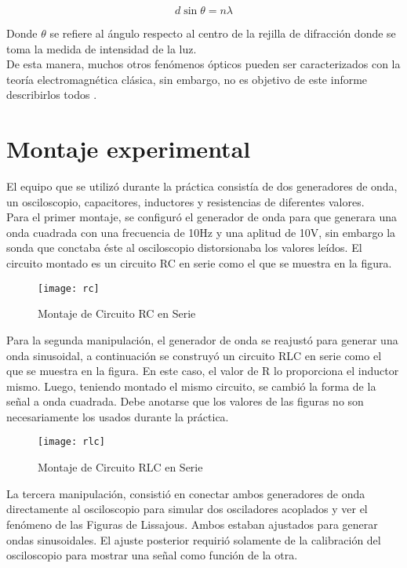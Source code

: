\documentclass[%
 reprint,
 amsmath,amssymb,
 aps,
]{revtex4-1}
\begin{document}
\begin{equation}
d\sin{\theta} = n\lambda
\end{equation}

Donde $\theta$ se refiere al ángulo respecto al centro de la rejilla de difracción donde se toma la medida de intensidad de la luz.\\

De esta manera, muchos otros fenómenos ópticos pueden ser caracterizados con la teoría electromagnética clásica, sin embargo, no es objetivo de este informe describirlos todos .\\ 



\section{\label{sec:level1}Montaje experimental}
El equipo que se utiliz\'o durante la práctica consist\'ia de dos generadores de onda, un osciloscopio, capacitores, inductores y resistencias de diferentes valores.\\

Para el primer montaje, se configur\'o el generador de onda para que generara una onda cuadrada con una frecuencia de 10Hz y una aplitud de 10V, sin embargo la sonda que conctaba \'este al osciloscopio distorsionaba los valores le\'idos. El circuito montado es un circuito RC en serie como el que se muestra en la figura.\\

\begin{figure}[h!]
\caption{Montaje de Circuito RC en Serie}
\centering
\texttt{[image: rc]}
\end{figure}

Para la segunda manipulaci\'on, el generador de onda se reajust\'o para generar una onda sinusoidal, a continuaci\'on se construy\'o un circuito RLC en serie como el que se muestra en la figura. En este caso, el valor de R lo proporciona el inductor mismo. Luego, teniendo montado el mismo circuito, se cambi\'o la forma de la señal a onda cuadrada. Debe anotarse que los valores de las figuras no son necesariamente los usados durante la pr\'actica. \\

\begin{figure}[h!]
\caption{Montaje de Circuito RLC en Serie}
\centering
\texttt{[image: rlc]}
\end{figure}


La tercera manipulaci\'on, consisti\'o en conectar ambos generadores de onda directamente al osciloscopio para simular dos osciladores acoplados y ver el fen\'omeno de las Figuras de Lissajous. Ambos estaban ajustados para generar ondas sinusoidales. El ajuste posterior requiri\'o solamente de la calibraci\'on del osciloscopio para mostrar una señal como funci\'on de la otra. 
\end{document}
